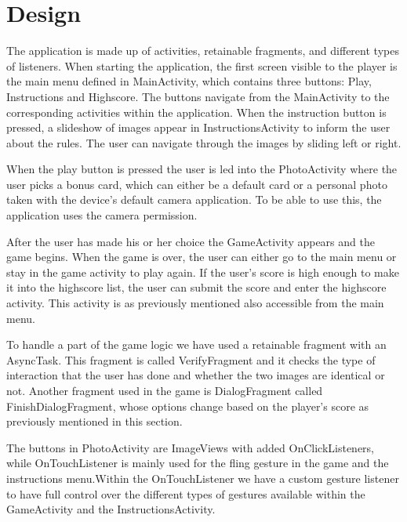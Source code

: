 \section{Design}
The application is made up of activities, retainable fragments, and different types of listeners. When starting the application, the first screen visible to the player is the main menu defined in MainActivity, which contains three buttons: Play, Instructions and Highscore. The buttons navigate from the MainActivity to the corresponding activities within the application. When the instruction button is pressed, a slideshow of images appear in InstructionsActivity to inform the user about the rules. The user can navigate through the images by sliding left or right. \newline

When the play button is pressed the user is led into the PhotoActivity where the user picks a bonus card, which can either be a default card or a personal photo taken with the device’s default camera application. To be able to use this, the application uses the camera permission. \newline

After the user has made his or her choice the GameActivity appears and the game begins. When the game is over, the user can either go to the main menu or stay in the game activity to play again. If the user’s score is high enough to make it into the highscore list, the user can submit the score and enter the highscore activity. This activity is as previously mentioned also accessible from the main menu. \newline

To handle a part of the game logic we have used a retainable fragment with an AsyncTask. This fragment is called VerifyFragment and it checks the type of interaction that the user has done and whether the two images are identical or not. Another fragment used in the game is DialogFragment called FinishDialogFragment, whose options change based on the player’s score as previously mentioned in this section. \newline

The buttons in PhotoActivity are ImageViews with added OnClickListeners, while OnTouchListener is mainly used for the fling gesture in the game and the instructions menu.Within the OnTouchListener we have a custom gesture listener to have full control over the different types of gestures available within the GameActivity and the InstructionsActivity.